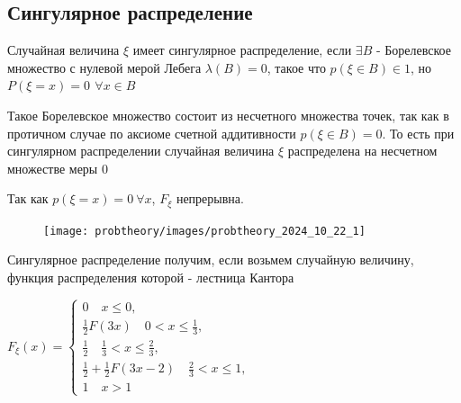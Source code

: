 \documentclass[12pt]{article}
\begin{document}
    \hypertarget{singulardistribution}{}

    \subsection{Сингулярное распределение}

    \Def Случайная величина $\xi$ имеет сингулярное распределение, если $\exists B$ - Борелевское множество с нулевой мерой Лебега $\lambda(B) = 0$, такое что $p(\xi \in B) \in 1$, но $P(\xi = x) = 0 \ \, \forall x \in B$

    \Nota Такое Борелевское множество состоит из несчетного множества точек, так как в протичном случае по аксиоме счетной аддитивности $p(\xi \in B) = 0$. То есть 
    при сингулярном распределении случайная величина $\xi$ распределена на несчетном множестве меры 0

    \Notas Так как $p(\xi = x) = 0 \  \forall x$, $F_\xi$ непрерывна.

    \smallvspace
    
    \begin{minipage}{\textwidth}
        \begin{figure}
            \texttt{[image: probtheory/images/probtheory\_2024\_10\_22\_1]}
        \end{figure}







        \Exs Сингулярное распределение получим, если возьмем случайную величину, функция распределения которой - 
        лестница Кантора
    
        $F_\xi(x) = \begin{cases}0 \quad x \leq 0, \\ \frac{1}{2}F(3x) \quad 0 < x \leq \frac{1}{3}, \\ \frac{1}{2} \quad \frac{1}{3} < x \leq \frac{2}{3}, \\ \frac{1}{2} + \frac{1}{2}F(3x - 2) \quad \frac{2}{3} < x \leq 1, \\ 1 \quad x > 1\end{cases}$
    \end{minipage}
\end{document}
